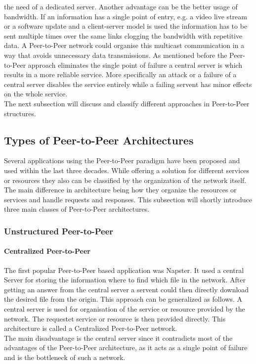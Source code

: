the need of a dedicated server. Another advantage can be the better
usage of bandwidth. If an information has a single point of entry,
e.g. a video live stream or a software update and a client-server model is used
the information has to be sent multiple times over the same links clogging the
bandwidth with repetitive data. A Peer-to-Peer network could organise this
multicast communication in a way that avoids unnecessary data transmissions. As
mentioned before the Peer-to-Peer approach eliminates the single point of
failure a central server is which results in a more reliable service. More
specifically an attack or a failure of a central server disables the service
entirely while a failing servent has minor effects on the whole service.
\\
The next subsection will discuss and classify different approaches in Peer-to-Peer
structures.
\subsection{Types of Peer-to-Peer Architectures}
Several applications using the Peer-to-Peer paradigm have been proposed and used
within the last three decades. While offering a solution for different services
or resources they also can be classified by the organization of the network
itself. The main difference in architecture being how they organize the
resources or services and handle requests and responses. This subsection will
shortly introduce three main classes of Peer-to-Peer architectures.
\subsubsection{Unstructured Peer-to-Peer}
\paragraph{Centralized Peer-to-Peer}
The first popular Peer-to-Peer based application was Napster. It used a
central Server for storing the information where to find which file in the
network. After getting an answer from the central server a servent could then
directly download the desired file from the origin. This approach can be
generalized as follows. A central server is used for organisation
of the service or resource provided by the network. The requestet service or
resource is then provided directly. This architecture is called a
Centralized Peer-to-Peer network.
\\
The main disadvantage is the central server since it contradicts most of the
 advantages of the Peer-to-Peer architecture, as it acts as a single point of 
failure and is the bottleneck of such a network.
